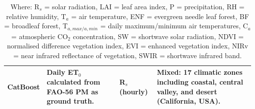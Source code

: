 \begin{table}[H]
\begin{tabularx}{\linewidth}{X | X | X | X}
		\hline
		
		
		CatBoost \newline \parencite{ahmadi2024solaret} & Daily ET$_0$ calculated from FAO-56 PM as ground truth. & R$_s$ (hourly) & Mixed: 17 climatic zones including coastal, central valley, and desert (California, USA). \\
		
		\hline \hline
	\end{tabularx}  
	\captionsetup{justification=centering}
	\caption{Where: R$_s$ = solar radiation, LAI = leaf area index, P = precipitation, RH = relative humidity, T$_a$ = air temperature, ENF = evergreen needle leaf forest, BF = broadleaf forest, T$_{a,max/a,min}$ = daily maximum/minimum air temperatures, C$_a$ = atmospheric CO$_2$ concentration, SW = shortwave solar radiation, NDVI = normalised difference vegetation index, EVI = enhanced vegetation index, NIRv = near infrared reflectance of vegetation, SWIR = shortwave infrared band.}
\end{table}
\newpage
